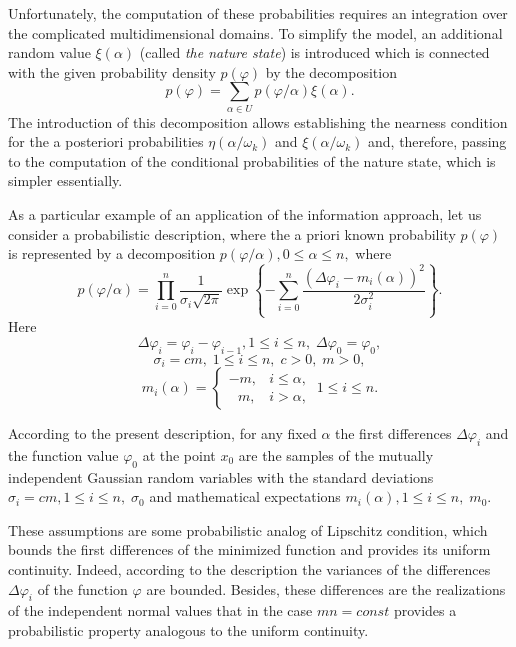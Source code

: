 Unfortunately, the computation of these probabilities requires an integration over the complicated multidimensional domains. To simplify the model, an additional random value  $\xi(\alpha)$ (called \textit{the nature state}) is introduced  which is connected with the given  probability density $p(\varphi)$  by the decomposition 
\begin{equation}
\label{eq:2_5}
p(\varphi)=\sum_{\alpha\in U}p(\varphi/\alpha)\xi(\alpha).
\end{equation}
The introduction of this decomposition allows establishing the nearness condition for the a posteriori probabilities $\eta(\alpha/\omega_k)$  and $\xi(\alpha/\omega_k)$  and, therefore, passing to the computation of the conditional probabilities of the nature state, which is simpler essentially.

As a particular example of an application of the information approach, let us consider a probabilistic description, where the a priori known probability $p(\varphi)$ is represented by a decomposition $p(\varphi/\alpha),0\leq \alpha\leq n,$ where
\begin{equation}
\label{eq:2_6}
p(\varphi/\alpha)=\prod_{i=0}^n {\frac{1}{\sigma_i\sqrt{2\pi}}\exp\left\{-\sum_{i=0}^n {\frac{(\Delta\varphi_i-m_i(\alpha))^2}{2\sigma_i^2}}\right\}}.
\end{equation}
Here
\begin{displaymath}
\Delta\varphi_i=\varphi_i-\varphi_{i-1},1\leq i\leq n,\; \Delta\varphi_0=\varphi_0,
\end{displaymath}
\begin{displaymath}
\sigma_i=cm,\;1\leq i\leq n,\;c>0,\;m>0,
\end{displaymath}
\begin{displaymath}
m_i(\alpha) =
  \begin{cases}
    -m, & i\leq\alpha, \\
    \ \ \  m, & i>\alpha,
  \end{cases} \ 1\leq i\leq n.
\end{displaymath}

According to the present description, for any fixed $\alpha$  the first differences $\Delta\varphi_i$  and the function value $\varphi_0$  at the point $x_0$ are the samples of the mutually independent Gaussian random variables with the standard deviations $\sigma_i=cm,1\leq i \leq n,\;\sigma_0$   and mathematical expectations $m_i(\alpha),1\leq i\leq n,\;m_0$.

These assumptions are some probabilistic analog of Lipschitz condition, which bounds the first differences of the minimized function and provides its uniform continuity. Indeed, according to the description the variances of the differences $\Delta\varphi_i$  of the function $\varphi$ are bounded. Besides, these differences are the realizations of the independent normal values that in the case $mn=const$  provides a probabilistic property analogous to the uniform continuity.

